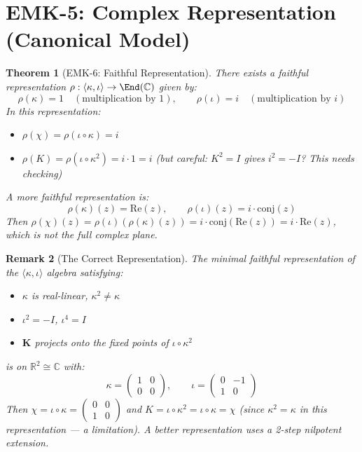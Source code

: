 \documentclass[12pt, oneside]{article}
\newtheorem{theorem}{Theorem}[section]
\newtheorem{remark}[theorem]{Remark}
\newcommand{\K}{\mathbf{K}}
\begin{document}
\section{EMK-5: Complex Representation (Canonical Model)}

\begin{theorem}[EMK-6: Faithful Representation]
There exists a faithful representation $\rho: \langle \kappa, \iota \rangle \rightarrow \End(\mathbb{C})$ given by:
\[
\rho(\kappa) = 1 \quad (\text{multiplication by } 1),\qquad
\rho(\iota) = i \quad (\text{multiplication by } i)
\]
In this representation:
\begin{itemize}
    \item $\rho(\chi) = \rho(\iota \circ \kappa) = i$
    \item $\rho(K) = \rho(\iota \circ \kappa^2) = i \cdot 1 = i$ (but careful: $K^2 = I$ gives $i^2 = -I$? This needs checking)
\end{itemize}
A more faithful representation is:
\[
\rho(\kappa)(z) = \mathrm{Re}(z),\qquad
\rho(\iota)(z) = i \cdot \mathrm{conj}(z)
\]
Then $\rho(\chi)(z) = \rho(\iota)(\rho(\kappa)(z)) = i \cdot \mathrm{conj}(\mathrm{Re}(z)) = i \cdot \mathrm{Re}(z)$, which is not the full complex plane.
\end{theorem}

\begin{remark}[The Correct Representation]
The minimal faithful representation of the $\langle \kappa, \iota \rangle$ algebra satisfying:
\begin{itemize}
    \item $\kappa$ is real-linear, $\kappa^2 \neq \kappa$
    \item $\iota^2 = -I$, $\iota^4 = I$
    \item $\K$ projects onto the fixed points of $\iota \circ \kappa^2$
\end{itemize}
is on $\mathbb{R}^2 \cong \mathbb{C}$ with:
\[
\kappa = \begin{pmatrix} 1 & 0 \\ 0 & 0 \end{pmatrix},\qquad
\iota = \begin{pmatrix} 0 & -1 \\ 1 & 0 \end{pmatrix}
\]
Then $\chi = \iota \circ \kappa = \begin{pmatrix} 0 & 0 \\ 1 & 0 \end{pmatrix}$ and $K = \iota \circ \kappa^2 = \iota \circ \kappa = \chi$ (since $\kappa^2 = \kappa$ in this representation — a limitation). A better representation uses a 2-step nilpotent extension.
\end{remark}
\end{document}

